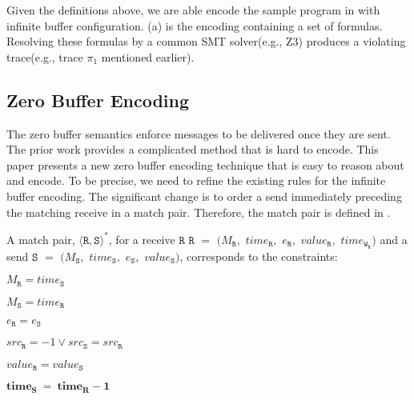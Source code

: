 Given the definitions above, we are able encode the sample program in  with infinite buffer configuration. (a) is the encoding containing a set of formulas. Resolving these formulas by a common SMT solver(e.g., Z3) produces a violating trace(e.g., trace $\pi_1$ mentioned earlier). 


\encodingcc

\exampleencoding

\subsection{Zero Buffer Encoding}
The zero buffer semantics enforce messages to be delivered once they are sent. The prior work \cite{DBLP:conf/kbse/HuangMM13} provides a complicated method that is hard to encode. This paper presents a new zero buffer encoding technique that is easy to reason about and encode. To be precise, we need to refine the existing rules for the infinite buffer encoding. The significant change is to order a send immediately preceding the matching receive in a match pair. Therefore, the match pair is defined in . 

\begin{definition} \label{def:match*}
A match pair, $\langle\mathtt{R}, \mathtt{S}\rangle^*$, for a receive
$\mathtt{R}$ $\mathtt{R}$ $=$ $(M_\mathtt{R},$ $\mathit{time}_\mathtt{R},$ $e_\mathtt{R},$ $\mathit{value}_\mathtt{R},$ $\mathit{time}_{\mathtt{W}_\mathtt{R}})$ and a send $\mathtt{S}$ $=$ $(M_\mathtt{S},$ $\mathit{time}_\mathtt{S},$ $e_\mathtt{S},$ $\mathit{value}_\mathtt{S})$, corresponds to the constraints:
\begin{compactenum}
\item $M_{\mathtt{R}} = \mathit{time}_{\mathtt{S}}$
\item $M_{\mathtt{S}} = \mathit{time}_{\mathtt{R}}$
\item $e_{\mathtt{R}} = e_{\mathtt{S}}$
\item $src_\mathtt{R} = -1 \vee src_\mathtt{S} = src_\mathtt{R}$
\item $\mathit{value}_{\mathtt{R}} = \mathit{value}_{\mathtt{S}}$ 
\item $\mathit{\textbf{time}}_{\mathtt{\textbf{S}}}\ = \ \mathit{\textbf{time}}_{\mathtt{\textbf{R}}} - \mathit{\textbf{1}}$
\end{compactenum}
\end{definition}

